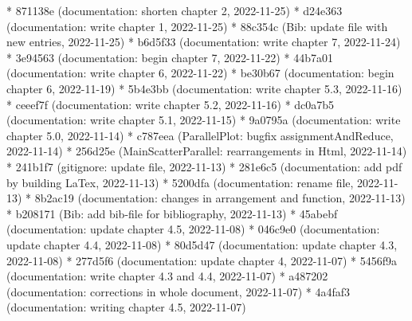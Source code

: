 \documentclass[usegeometry=true]{scrartcl}
\begin{document}
* 871138e (documentation: shorten chapter 2, 2022-11-25)\newline
* d24e363 (documentation: write chapter 1, 2022-11-25)\newline
* 88c354c (Bib: update file with new entries, 2022-11-25)\newline
* b6d5f33 (documentation: write chapter 7, 2022-11-24)\newline
* 3e94563 (documentation: begin chapter 7, 2022-11-22)\newline
* 44b7a01 (documentation: write chapter 6, 2022-11-22)\newline
* be30b67 (documentation: begin chapter 6, 2022-11-19)\newline
* 5b4e3bb (documentation: write chapter 5.3, 2022-11-16)\newline
* ceeef7f (documentation: write chapter 5.2, 2022-11-16)\newline
* dc0a7b5 (documentation: write chapter 5.1, 2022-11-15)\newline
* 9a0795a (documentation: write chapter 5.0, 2022-11-14)\newline
* c787eea (ParallelPlot: bugfix assignmentAndReduce, 2022-11-14)\newline
* 256d25e (MainScatterParallel: rearrangements in Html, 2022-11-14)\newline
* 241b1f7 (gitignore: update file, 2022-11-13)\newline
* 281e6c5 (documentation: add pdf by building LaTex, 2022-11-13)\newline
* 5200dfa (documentation: rename file, 2022-11-13)\newline
* 8b2ac19 (documentation: changes in arrangement and function, 2022-11-13)\newline
* b208171 (Bib: add bib-file for bibliography, 2022-11-13)\newline
* 45abebf (documentation: update chapter 4.5, 2022-11-08)\newline
* 046c9e0 (documentation: update chapter 4.4, 2022-11-08)\newline
* 80d5d47 (documentation: update chapter 4.3, 2022-11-08)\newline
* 277d5f6 (documentation: update chapter 4, 2022-11-07)\newline
* 5456f9a (documentation: write chapter 4.3 and 4.4, 2022-11-07)\newline
* a487202 (documentation: corrections in whole document, 2022-11-07)\newline
* 4a4faf3 (documentation: writing chapter 4.5, 2022-11-07)\newline
\end{document}
